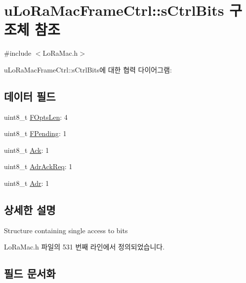\hypertarget{structu_lo_ra_mac_frame_ctrl_1_1s_ctrl_bits}{}\section{u\+Lo\+Ra\+Mac\+Frame\+Ctrl\+:\+:s\+Ctrl\+Bits 구조체 참조}
\label{structu_lo_ra_mac_frame_ctrl_1_1s_ctrl_bits}


{\ttfamily \#include $<$Lo\+Ra\+Mac.\+h$>$}



u\+Lo\+Ra\+Mac\+Frame\+Ctrl\+:\+:s\+Ctrl\+Bits에 대한 협력 다이어그램\+:
\subsection*{데이터 필드}
\begin{DoxyCompactItemize}
\item 
uint8\+\_\+t \mbox{\hyperlink{structu_lo_ra_mac_frame_ctrl_1_1s_ctrl_bits_aca65acebde222837502f6cf8e2aeeac8}{F\+Opts\+Len}}\+: 4
\item 
uint8\+\_\+t \mbox{\hyperlink{structu_lo_ra_mac_frame_ctrl_1_1s_ctrl_bits_a2d5d8f602343aff45f870d4c38ffa0df}{F\+Pending}}\+: 1
\item 
uint8\+\_\+t \mbox{\hyperlink{structu_lo_ra_mac_frame_ctrl_1_1s_ctrl_bits_a7a652a0a459bea0bd46edc2b83c3eacc}{Ack}}\+: 1
\item 
uint8\+\_\+t \mbox{\hyperlink{structu_lo_ra_mac_frame_ctrl_1_1s_ctrl_bits_ae07af36cd9769b8a153f393715d7eaa7}{Adr\+Ack\+Req}}\+: 1
\item 
uint8\+\_\+t \mbox{\hyperlink{structu_lo_ra_mac_frame_ctrl_1_1s_ctrl_bits_af5bcc6a131748c79430a7ce1198e0d7f}{Adr}}\+: 1
\end{DoxyCompactItemize}


\subsection{상세한 설명}
Structure containing single access to bits 

Lo\+Ra\+Mac.\+h 파일의 531 번째 라인에서 정의되었습니다.



\subsection{필드 문서화}
\mbox{\label{structu_lo_ra_mac_frame_ctrl_1_1s_ctrl_bits_a7a652a0a459bea0bd46edc2b83c3eacc}} 
